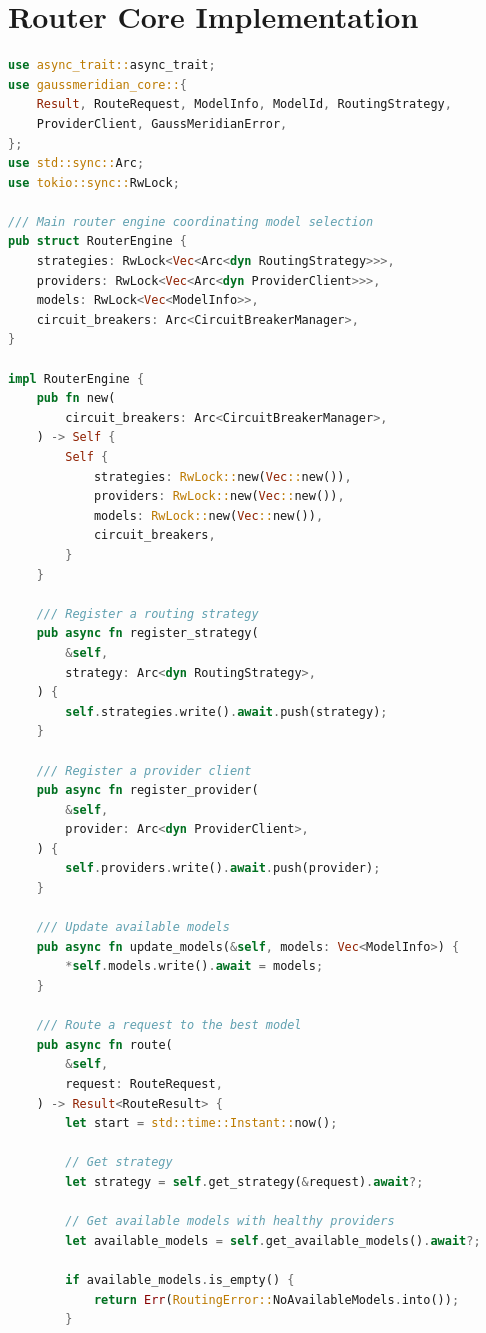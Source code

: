 \documentclass[12pt,a4paper,twoside]{report}
\begin{document}
\section{Router Core Implementation}

\begin{lstlisting}[language=Rust,caption={Router Engine - crates/gaussmeridian-router/src/lib.rs}]
use async_trait::async_trait;
use gaussmeridian_core::{
    Result, RouteRequest, ModelInfo, ModelId, RoutingStrategy,
    ProviderClient, GaussMeridianError,
};
use std::sync::Arc;
use tokio::sync::RwLock;

/// Main router engine coordinating model selection
pub struct RouterEngine {
    strategies: RwLock<Vec<Arc<dyn RoutingStrategy>>>,
    providers: RwLock<Vec<Arc<dyn ProviderClient>>>,
    models: RwLock<Vec<ModelInfo>>,
    circuit_breakers: Arc<CircuitBreakerManager>,
}

impl RouterEngine {
    pub fn new(
        circuit_breakers: Arc<CircuitBreakerManager>,
    ) -> Self {
        Self {
            strategies: RwLock::new(Vec::new()),
            providers: RwLock::new(Vec::new()),
            models: RwLock::new(Vec::new()),
            circuit_breakers,
        }
    }
    
    /// Register a routing strategy
    pub async fn register_strategy(
        &self,
        strategy: Arc<dyn RoutingStrategy>,
    ) {
        self.strategies.write().await.push(strategy);
    }
    
    /// Register a provider client
    pub async fn register_provider(
        &self,
        provider: Arc<dyn ProviderClient>,
    ) {
        self.providers.write().await.push(provider);
    }
    
    /// Update available models
    pub async fn update_models(&self, models: Vec<ModelInfo>) {
        *self.models.write().await = models;
    }
    
    /// Route a request to the best model
    pub async fn route(
        &self,
        request: RouteRequest,
    ) -> Result<RouteResult> {
        let start = std::time::Instant::now();
        
        // Get strategy
        let strategy = self.get_strategy(&request).await?;
        
        // Get available models with healthy providers
        let available_models = self.get_available_models().await?;
        
        if available_models.is_empty() {
            return Err(RoutingError::NoAvailableModels.into());
        }
        

\end{lstlisting}
\end{document}
